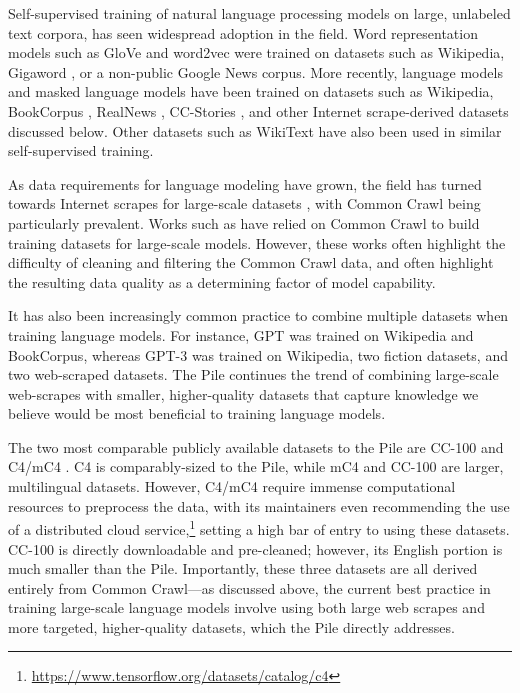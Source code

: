 Self-supervised training of natural language processing models on large, unlabeled text corpora, has seen widespread adoption in the field. Word representation models such as GloVe \citep{pennington2014glove} and word2vec \citep{mikolov2013word2vec} were trained on datasets such as Wikipedia, Gigaword \citep{graff2003english}, or a non-public Google News corpus. More recently, language models \citep{GPT,GPT2,GPT3,TuringNLG,Megatron} and masked language models \citep{BERT,RoBERTa,T5} have been trained on datasets such as Wikipedia, BookCorpus \citep{BookCorpus}, RealNews \citep{zellers2019neuralfakenews}, CC-Stories \citep{trinh2018commonsense}, and other Internet scrape-derived datasets discussed below. Other datasets such as WikiText \citep{wikitext} have also been used in similar self-supervised training. 

As data requirements for language modeling have grown, the field has turned towards Internet scrapes for large-scale datasets \citep{OpenWeb}, with Common Crawl being particularly prevalent. Works such as \citet{GPT3,wenzek2019ccnet,OSCAR,T5} have relied on Common Crawl to build training datasets for large-scale models. However, these works often highlight the difficulty of cleaning and filtering the Common Crawl data, and often highlight the resulting data quality as a determining factor of model capability.

It has also been increasingly common practice to combine multiple datasets when training language models. For instance, GPT \citep{GPT} was trained on Wikipedia and BookCorpus, whereas GPT-3 \citep{GPT3} was trained on Wikipedia, two fiction datasets, and two web-scraped datasets. The Pile continues the trend of combining large-scale web-scrapes with smaller, higher-quality datasets that capture knowledge we believe would be most beneficial to training language models.

The two most comparable publicly available datasets to the Pile are CC-100 \citep{wenzek2019ccnet} and C4/mC4 \citep{T5}. C4 is comparably-sized to the Pile, while mC4 and CC-100 are larger, multilingual datasets. However, C4/mC4 require immense computational resources to preprocess the data, with its maintainers even recommending the use of a distributed cloud service,\footnote{\url{https://www.tensorflow.org/datasets/catalog/c4}} setting a high bar of entry to using these datasets. CC-100 is directly downloadable and pre-cleaned; however, its English portion is much smaller than the Pile. Importantly, these three datasets are all derived entirely from Common Crawl---as discussed above, the current best practice in training large-scale language models involve using both large web scrapes and more targeted, higher-quality datasets, which the Pile directly addresses.

